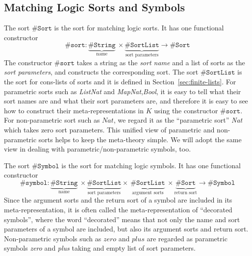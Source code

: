 \documentclass[UTF8,11pt]{article}
\theoremstyle{plain}
\theoremstyle{definition}
\theoremstyle{remark}
\newcommand{\Nat}{\textit{Nat}}
\newcommand{\Bool}{\textit{Bool}}
\newcommand{\List}{\textit{List}}
\newcommand{\Map}{\textit{Map}}
\newcommand{\parametric}[2]{{#1}\raisebox{.2ex}{\texttt{\footnotesize{\{}}}#2\raisebox{.2ex}{\texttt{\footnotesize{\}}}}}
\newcommand{\zero}{\textit{zero}}
\newcommand{\sharpsymbol}{\#}
\newcommand{\KString}{\texttt{\sharpsymbol String}}
\newcommand{\KSort}{\texttt{\sharpsymbol Sort}}
\newcommand{\Ksort}{\texttt{\sharpsymbol sort}}
\newcommand{\KSymbol}{\texttt{\sharpsymbol Symbol}}
\newcommand{\Ksymbol}{\texttt{\sharpsymbol symbol}}
\newcommand{\KSortList}{\texttt{\sharpsymbol SortList}}
\begin{document}
\subsection{Matching Logic Sorts and Symbols}
\label{sec:ML-sorts-symbols}

The sort $\KSort$ is the sort for matching logic sorts.
It has one functional constructor
$$
\Ksort \colon \underbrace{\KString}_\text{name}\  \times
\underbrace{\KSortList}_\text{sort parameters} \to \KSort
$$
The constructor $\Ksort$ takes a string as the \emph{sort name} and a list of
sorts as the \emph{sort parameters},
and constructs the corresponding sort.
The sort $\KSortList$ is the sort for cons-lists of sorts and it is defined in
Section~\ref{sec:finite-lists}.
For parametric sorts such as \parametric{\List}{\Nat} and
\parametric{\Map}{\Nat,\Bool}, it is easy to tell what their sort names are and
what their sort parameters are, and therefore it is easy to see how to
construct their meta-representations in $K$ using the constructor $\Ksort$.
For non-parametric sort such as $\Nat$, we regard it as the ``parametric sort''
\parametric{\Nat}{} which takes zero sort parameters.
This unified view of parametric and non-parametric sorts helps to keep the
meta-theory simple.
We will adopt the same view in dealing with parametric/non-parametric symbols,
too.

The sort $\KSymbol$ is the sort for matching logic symbols.
It has one functional constructor
\begin{equation*}
\Ksymbol \colon {\underbrace{\KString}_\text{name}}\
\times
\underbrace{\KSortList}_\text{sort parameters}
\times\
\underbrace{\KSortList}_\text{argument sorts} \
\times \underbrace{\KSort}_\text{return sort} \to
\KSymbol
\end{equation*}
Since the argument sorts and the return sort of a symbol are included in its
meta-representation, it is often called the meta-representation of ``decorated
symbols'', where the word ``decorated'' means that not only the name and sort
parameters of a symbol are included, but also its argument sorts and return
sort.
Non-parametric symbols such as $\zero$ and $\textit{plus}$ are regarded
as parametric symbols \parametric{\zero}{} and
\parametric{\textit{plus}}{} taking and empty list of sort parameters.
\end{document}

